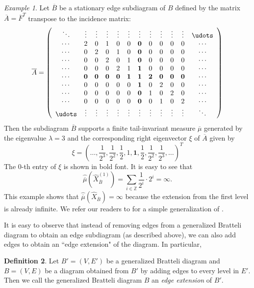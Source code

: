 \documentclass[11pt,reqno]{amsart}
\theoremstyle{definition}
\newtheorem{definition}{Definition}[section]
\theoremstyle{remark}
\newtheorem{example}[definition]{Example}
\theoremstyle{plain}
\def\ol{\overline}
\def\ov{\overline}
\numberwithin{equation}{section}
\begin{document}
\begin{example}
Let $\ov B$ be a stationary edge subdiagram of $B$ defined by the matrix $\ov A = {\ov F}^{T}$ transpose to the incidence matrix: 
\begin{equation*}
\ov A =  \left(
  \begin{array}{cccccccccccc}
   \ddots & \vdots & \vdots & \vdots & \vdots & \vdots & \vdots 
   & \vdots & \vdots & \vdots & \vdots & \udots\\
    \cdots & 2 & 0 & 1 & 0 & 0 & \textbf  0 & 0 & 0 & 0 & 0 & \cdots\\
    \cdots & 0 & 2 & 0 & 1 & 0 & \textbf 0 & 0 & 0 & 0 & 0 & \cdots\\
    \cdots & 0 & 0 & 2 & 0 & 1 & \textbf  0 & 0 & 0 & 0 & 0 & \cdots\\
    \cdots & 0 & 0 & 0 & 2 & 1 & \textbf 1 & 0 & 0 & 0 & 0 & \cdots\\
    \cdots & \textbf 0 & \textbf 0 &\textbf  0 &\textbf  0 &\textbf{1} & \textbf 1 & 
    \textbf{2} &\textbf 0 &\textbf 0 &\textbf 0 & \cdots\\
    \cdots & 0 & 0 & 0 & 0 & 0 & \textbf  1 & 0 & 2 & 0 & 0 & \cdots\\
    \cdots & 0 & 0 & 0 & 0 & 0 &\textbf  0 & 1 & 0 & 2 & 0 & \cdots\\
    \cdots & 0 & 0 & 0 & 0 & 0 &\textbf  0 & 0 & 1 & 0 & 2 & \cdots\\
    \udots & \vdots & \vdots & \vdots & \vdots & \vdots & \vdots & 
    \vdots & \vdots & \vdots & \vdots & \ddots\\
    \end{array}
\right)
\end{equation*} 
Then the subdiagram $\ov B$ supports a finite tail-invariant measure 
$\ov \mu$ generated by the eigenvalue $\lambda = 3$ and the 
corresponding right eigenvector $\xi$ of $\ov A$ given by
$$
\xi = \left(\ldots, \dfrac{1}{2^3}, 
\dfrac{1}{2^2}, \dfrac{1}{2},1, \mathbf{1},
\dfrac{1}{2}, \dfrac{1}{2^2}, 
\dfrac{1}{2^3}, \ldots \right)^T
$$ 
The 0-th entry of $\xi$ is shown in bold font. 
It is easy to see that 
$$
\widehat{\overline{\mu}}(\widehat{X}_{\ol B}^{(1)}) = \sum_{i \in \mathbb{Z}} \frac{1}{2^i} \cdot 2^i = \infty.
$$
This example shows that $\widehat{\overline{\mu}}(\widehat{X}_{\ol B}) = \infty$ because the extension from the first level is already infinite. We refer our readers to \cite[Example 7.7]{BezuglyiJorgensenKarpelSanadhya2025} for a simple generalization of .
\end{example}

It is easy to observe that instead of removing edges from a generalized Bratteli diagram to obtain an edge subdiagram (as described above), we can also add edges to obtain an ``edge extension" of the diagram. In particular,
\begin{definition}
Let $B' = (V, E')$ be a generalized Bratteli diagram and $B = (V, E)$ be a diagram obtained from $B'$ by adding edges to every level in $E'$. Then we call the generalized Bratteli diagram $B$ an \textit{edge extension} of $B'$. 
\end{definition}
\end{document}
